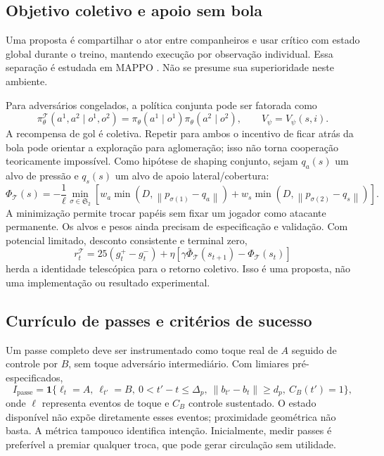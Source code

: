 \documentclass[11pt,a4paper]{article}
\newcommand{\ind}{\mathbf{1}}
\newcommand{\norm}[1]{\left\lVert#1\right\rVert}
\begin{document}
\subsection{Objetivo coletivo e apoio sem bola}
Uma proposta é compartilhar o ator entre companheiros e usar crítico com estado global durante o treino, mantendo execução por observação individual. Essa separação é estudada em MAPPO \cite{yu2022}. Não se presume sua superioridade neste ambiente.

Para adversários congelados, a política conjunta pode ser fatorada como
\begin{equation}
 \pi_\theta^{\mathcal T}(a^1,a^2\mid o^1,o^2)
 =\pi_\theta(a^1\mid o^1)\pi_\theta(a^2\mid o^2),
 \qquad V_\psi=V_\psi(s,i).
\end{equation}
A recompensa de gol é coletiva. Repetir para ambos o incentivo de ficar atrás da bola pode orientar a exploração para aglomeração; isso não torna cooperação teoricamente impossível. Como hipótese de shaping conjunto, sejam $q_a(s)$ um alvo de pressão e $q_s(s)$ um alvo de apoio lateral/cobertura:
\begin{equation}
 \Phi_{\mathcal T}(s)=-\frac{1}{\ell}\min_{\sigma\in\mathfrak S_2}
 \left[w_a\min(D,\norm{p_{\sigma(1)}-q_a})+
 w_s\min(D,\norm{p_{\sigma(2)}-q_s})\right].
\end{equation}
A minimização permite trocar papéis sem fixar um jogador como atacante permanente. Os alvos e pesos ainda precisam de especificação e validação. Com potencial limitado, desconto consistente e terminal zero,
\begin{equation}
 r_t^{\mathcal T}=25(g_t^+-g_t^-)+
 \eta[\gamma\bar\Phi_{\mathcal T}(s_{t+1})-\Phi_{\mathcal T}(s_t)]
\end{equation}
herda a identidade telescópica para o retorno coletivo. Isso é uma proposta, não uma implementação ou resultado experimental.

\subsection{Currículo de passes e critérios de sucesso}
Um passe completo deve ser instrumentado como toque real de $A$ seguido de controle por $B$, sem toque adversário intermediário. Com limiares pré-especificados,
\begin{equation}
 I_{\mathrm{passe}}=\ind\{\ell_t=A,\ \ell_{t'}=B,\
 0<t'-t\leq\Delta_p,\ \norm{b_{t'}-b_t}\geq d_p,\ C_B(t')=1\},
\end{equation}
onde $\ell$ representa eventos de toque e $C_B$ controle sustentado. O estado disponível não expõe diretamente esses eventos; proximidade geométrica não basta. A métrica tampouco identifica intenção. Inicialmente, medir passes é preferível a premiar qualquer troca, que pode gerar circulação sem utilidade.
\end{document}
